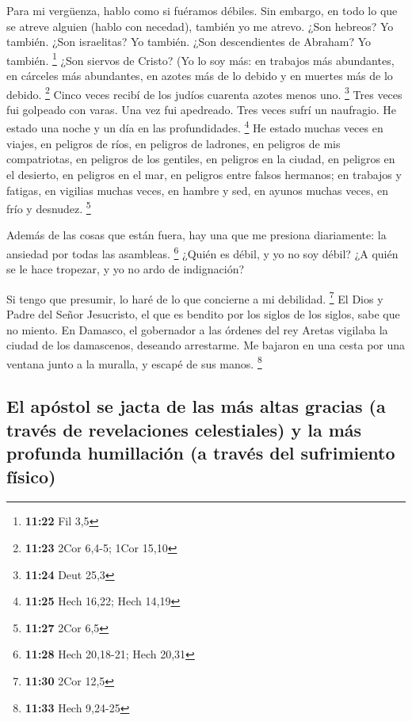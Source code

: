  Para mi vergüenza, hablo como si fuéramos débiles. Sin
embargo, en todo lo que se atreve alguien (hablo con necedad), también
yo me atrevo.  ¿Son hebreos? Yo también. ¿Son israelitas?
Yo también. ¿Son descendientes de Abraham? Yo también. \footnote{\textbf{11:22}
  Fil 3,5}  ¿Son siervos de Cristo? (Yo lo soy más: en
trabajos más abundantes, en cárceles más abundantes, en azotes más de lo
debido y en muertes más de lo debido. \footnote{\textbf{11:23} 2Cor
  6,4-5; 1Cor 15,10}  Cinco veces recibí de los judíos
cuarenta azotes menos uno. \footnote{\textbf{11:24} Deut 25,3}
 Tres veces fui golpeado con varas. Una vez fui
apedreado. Tres veces sufrí un naufragio. He estado una noche y un día
en las profundidades. \footnote{\textbf{11:25} Hech 16,22; Hech 14,19}
 He estado muchas veces en viajes, en peligros de ríos,
en peligros de ladrones, en peligros de mis compatriotas, en peligros de
los gentiles, en peligros en la ciudad, en peligros en el desierto, en
peligros en el mar, en peligros entre falsos hermanos; 
en trabajos y fatigas, en vigilias muchas veces, en hambre y sed, en
ayunos muchas veces, en frío y desnudez. \footnote{\textbf{11:27} 2Cor
  6,5}

 Además de las cosas que están fuera, hay una que me
presiona diariamente: la ansiedad por todas las asambleas. \footnote{\textbf{11:28}
  Hech 20,18-21; Hech 20,31}  ¿Quién es débil, y yo no
soy débil? ¿A quién se le hace tropezar, y yo no ardo de indignación?

 Si tengo que presumir, lo haré de lo que concierne a mi
debilidad. \footnote{\textbf{11:30} 2Cor 12,5}  El Dios y
Padre del Señor Jesucristo, el que es bendito por los siglos de los
siglos, sabe que no miento.  En Damasco, el gobernador a
las órdenes del rey Aretas vigilaba la ciudad de los damascenos,
deseando arrestarme.  Me bajaron en una cesta por una
ventana junto a la muralla, y escapé de sus manos. \footnote{\textbf{11:33}
  Hech 9,24-25}

\hypertarget{el-apuxf3stol-se-jacta-de-las-muxe1s-altas-gracias-a-travuxe9s-de-revelaciones-celestiales-y-la-muxe1s-profunda-humillaciuxf3n-a-travuxe9s-del-sufrimiento-fuxedsico}{%
\subsection{El apóstol se jacta de las más altas gracias (a través de
revelaciones celestiales) y la más profunda humillación (a través del
sufrimiento
físico)}\label{el-apuxf3stol-se-jacta-de-las-muxe1s-altas-gracias-a-travuxe9s-de-revelaciones-celestiales-y-la-muxe1s-profunda-humillaciuxf3n-a-travuxe9s-del-sufrimiento-fuxedsico}}

